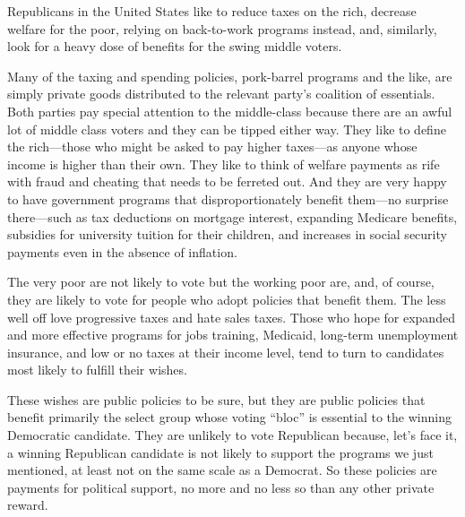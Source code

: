 \documentclass[10pt]{article}
\begin{document}
{\large Republicans in the United States like to reduce taxes on the rich,
decrease welfare for the poor, relying on back-to-work programs instead, and,
similarly, look for a heavy dose of benefits for the swing middle voters.}

{\large Many of the taxing and spending policies, pork-barrel programs and the
like, are simply private goods distributed to the relevant party's coalition of
essentials. Both parties pay special attention to the middle-class because there
are an awful lot of middle class voters and they can be tipped either way. They
like to define the rich---those who might be asked to pay higher taxes---as
anyone whose income is higher than their own. They like to think of welfare
payments as rife with fraud and cheating that needs to be ferreted out. And they
are very happy to have government programs that disproportionately benefit
them---no surprise there---such as tax deductions on mortgage interest, expanding
Medicare benefits, subsidies for university tuition for their children, and
increases in social security payments even in the absence of inflation.}

{\large The very poor are not likely to vote but the working poor are, and, of
course, they are likely to vote for people who adopt policies that benefit them.
The less well off love progressive taxes and hate sales taxes. Those who hope for
expanded and more effective programs for jobs training, Medicaid, long-term
unemployment insurance, and low or no taxes at their income level, tend to turn
to candidates most likely to fulfill their wishes.}

{\large These wishes are public policies to be sure, but they are public
policies that benefit primarily the select group whose voting ``bloc'' is
essential to the winning Democratic candidate. They are unlikely to vote
Republican because, let's face it, a winning Republican candidate is not likely
to support the programs we just mentioned, at least not on the same scale as a
Democrat. So these policies are payments for political support, no more and no
less so than any other private reward.}
\end{document}
